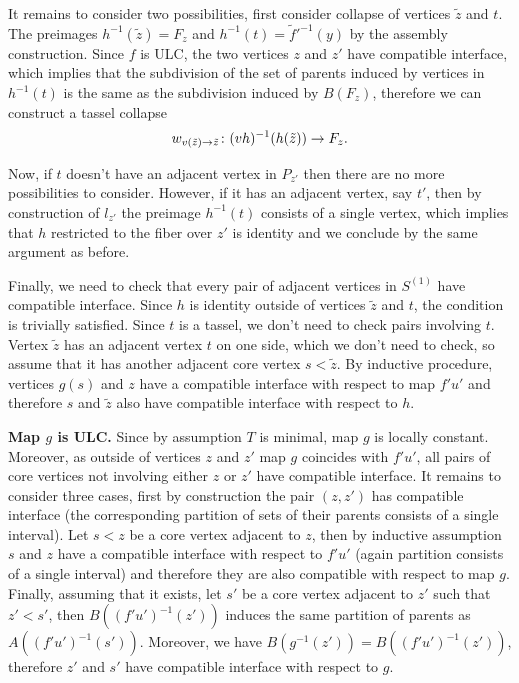 \documentclass[letterpaper,12pt,leqno]{article}
\numberwithin{equation}{theorem}
\begin{document}
It remains to consider two possibilities, first consider collapse of vertices $\tilde z$ and $t$. The preimages $h^{-1}(\tilde z) = F_z$ and $h^{-1}(t) = \tilde f'^{-1}(y)$ by the assembly construction.
Since $f$ is ULC, the two vertices $z$ and $z'$ have compatible interface, which implies that the subdivision of the set of parents induced by vertices in $h^{-1}(t)$ is the same as the
subdivision induced by $B(F_z)$, therefore we can construct a tassel collapse
$$
w_{v(\tilde z) \to \tilde z} \colon (vh)^{-1}(h(\tilde z)) \to F_z.
$$

Now, if $t$ doesn't have an adjacent vertex in $P_{z'}$ then there are no more possibilities to consider. However, if it has an adjacent vertex, say $t'$, then by construction of $l_{z'}$ the
preimage $h^{-1}(t)$ consists of a single vertex, which implies that $h$ restricted to the fiber over $z'$ is identity and we conclude by the same argument as before.

Finally, we need to check that every pair of adjacent vertices in $S^{(1)}$ have compatible interface. Since $h$ is identity outside of vertices $\tilde z$ and $t$, the condition is trivially
satisfied. Since $t$ is a tassel, we don't need to check pairs involving $t$. Vertex $\tilde z$ has an adjacent vertex $t$ on one side, which we don't need to check, so assume
that it has another adjacent core vertex $s < \tilde z$. By inductive procedure, vertices $g(s)$ and $z$ have a compatible interface with respect to map $f'u'$ and therefore
$s$ and $\tilde z$ also have compatible interface with respect to $h$.

{\bf Map $g$ is ULC.} Since by assumption $T$ is minimal, map $g$ is locally constant. Moreover, as outside of vertices $z$ and $z'$ map $g$ coincides with $f'u'$, all pairs
of core vertices not involving either $z$ or $z'$ have compatible interface. It remains to consider three cases, first by construction the pair $(z, z')$ has compatible interface
(the corresponding partition of sets of their parents consists of a single interval). Let $s < z$ be a core vertex adjacent to $z$, then by inductive assumption $s$ and $z$
have a compatible interface with respect to $f'u'$ (again partition consists of a single interval) and therefore they are also compatible with respect to map $g$. Finally,
assuming that it exists, let $s'$ be a core vertex adjacent to $z'$ such that $z' < s'$, then $B((f'u')^{-1}(z'))$ induces the same partition of parents as $A((f'u')^{-1}(s'))$.
Moreover, we have $B(g^{-1}(z')) = B((f'u')^{-1}(z'))$, therefore $z'$ and $s'$ have compatible interface with respect to $g$.
\end{document}

